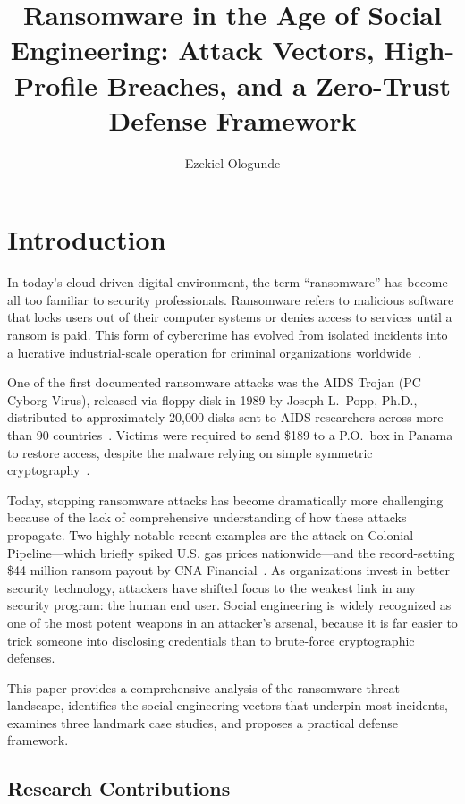 \documentclass[sigconf,nonacm]{acmart}
\title{Ransomware in the Age of Social Engineering: Attack Vectors, High-Profile Breaches, and a Zero-Trust Defense Framework}
\author{Ezekiel Ologunde}
\affiliation{\institution{Independent Researcher}\city{Boston}\state{MA}\country{USA}}
\begin{document}
\hfuzz=5pt
\maketitle

\section{Introduction}

In today's cloud-driven digital environment, the term ``ransomware'' has become
all too familiar to security professionals. Ransomware refers to malicious software that
locks users out of their computer systems or denies access to services until a ransom is
paid. This form of cybercrime has evolved from isolated incidents into a lucrative
industrial-scale operation for criminal organizations worldwide~\cite{groot2023}.

One of the first documented ransomware attacks was the AIDS Trojan (PC Cyborg Virus),
released via floppy disk in 1989 by Joseph L.\ Popp, Ph.D., distributed to approximately
20,000 disks sent to AIDS researchers across more than 90 countries~\cite{baker2022}.
Victims were required to send \$189 to a P.O.\ box in Panama to restore access, despite
the malware relying on simple symmetric cryptography~\cite{baker2022}.

Today, stopping ransomware attacks has become dramatically more challenging because of
the lack of comprehensive understanding of how these attacks propagate. Two highly
notable recent examples are the attack on Colonial Pipeline---which briefly spiked U.S.
gas prices nationwide---and the record-setting \$44 million ransom payout by CNA
Financial~\cite{cleary2023,kerner2022}. As organizations invest in better security
technology, attackers have shifted focus to the weakest link in any security program:
the human end user. Social engineering is widely recognized as one of the most potent
weapons in an attacker's arsenal, because it is far easier to trick someone into
disclosing credentials than to brute-force cryptographic defenses.

This paper provides a comprehensive analysis of the ransomware threat landscape,
identifies the social engineering vectors that underpin most incidents, examines three
landmark case studies, and proposes a practical defense framework.

\subsection{Research Contributions}
\end{document}
